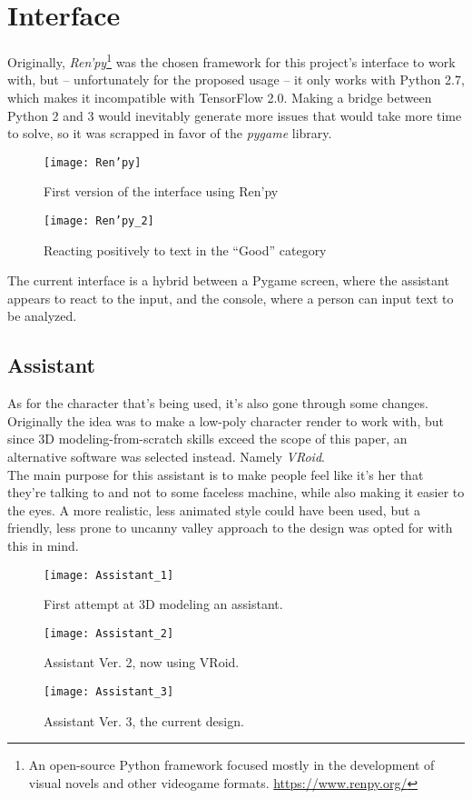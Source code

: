 \section{Interface}
Originally, \textit{Ren'py}\footnote{An open-source Python framework focused mostly in the development of visual novels and other videogame formats. \url{https://www.renpy.org/}} was the chosen framework for this project's interface to work with, but -- unfortunately for the proposed usage -- it only works with Python 2.7, which makes it incompatible with TensorFlow 2.0. Making a bridge between Python 2 and 3 would inevitably generate more issues that would take more time to solve, so it was scrapped in favor of the \textit{pygame} library.
\pagebreak

\begin{figure}[!h]
	\centering
	\texttt{[image: Ren'py]}
	\caption{First version of the interface using Ren'py}
	\label{fig:renpy_test_1}
\end{figure}
\begin{figure}[!h]
	\centering
	\texttt{[image: Ren'py\_2]}
	\caption{Reacting positively to text in the ``Good'' category}
	\label{fig:renpy_test_2}
\end{figure}

The current interface is a hybrid between a Pygame screen, where the assistant appears to react to the input, and the console, where a person can input text to be analyzed.
\pagebreak

\subsection{Assistant}
As for the character that's being used, it's also gone through some changes. Originally the idea was to make a low-poly character render to work with, but since 3D modeling-from-scratch skills exceed the scope of this paper, an alternative software was selected instead. Namely \textit{VRoid}.\\
The main purpose for this assistant is to make people feel like it's her that they're talking to and not to some faceless machine, while also making it easier to the eyes. A more realistic, less animated style could have been used, but a friendly, less prone to uncanny valley approach to the design was opted for with this in mind.
\begin{figure}[!ht]
	\centering
	\texttt{[image: Assistant\_1]}
	\caption{First attempt at 3D modeling an assistant.}
	\label{fig:assistant1}
\end{figure}
\begin{figure}[!ht]
	\centering
	\texttt{[image: Assistant\_2]}
	\caption{Assistant Ver. 2, now using VRoid.}
	\label{fig:assistant2}
\end{figure}
\begin{figure}[!ht]
	\centering
	\texttt{[image: Assistant\_3]}
	\caption{Assistant Ver. 3, the current design.}
	\label{fig:assistant3}
\end{figure}


